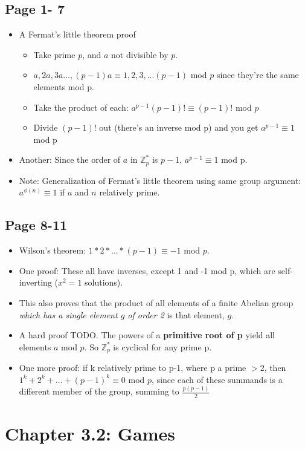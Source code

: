 \documentclass[11pt, oneside]{article}   	%
\begin{document}
\subsection{Page 1- 7}
\begin{itemize}
\item A Fermat's little theorem proof
 \begin{itemize}
  \item Take prime $p$, and $a$ not divisible by $p$.
   \item ${a, 2a, 3a ... , (p-1)a} \equiv {1, 2, 3, ... (p-1)}$ mod $p$ since they're the same elements mod p.
   \item Take the product of each: $a^{p-1}(p-1)! \equiv (p-1)!$ mod $p$
   \item Divide $(p-1)!$ out (there's an inverse mod p) and you get $a^{p-1} \equiv 1$ mod p
  \end{itemize}
 \item Another: Since the order of $a$ in $\mathbb{Z}_p^*$ is $p-1$, $a^{p-1} \equiv 1$ mod p.
 \item Note: Generalization of Fermat's little theorem using same group argument: $a^{\phi(n)} \equiv 1$ if $a$ and $n$ relatively prime.
 \end{itemize}
 
 \subsection{Page 8-11}
 \begin{itemize}
 \item Wilson's theorem: $1 * 2 * ... * (p-1) \equiv -1$ mod $p$.
 \item One proof: These all have inverses, except 1 and -1 mod p, which are self-inverting ($x^2 = 1$ solutions).
 \item This also proves that the product of all elements of a finite Abelian group \emph{which has a single element $g$ of order 2} is that element, $g$.
 \item A hard proof TODO. The powers of a \textbf{primitive root of p} yield all elements $a$ mod $p$.  So $\mathbb{Z}_p^*$ is cyclical for any prime p.
\item One more proof: if k relatively prime to p-1, where p a prime $> 2$, then $1^k + 2^k + ... + (p-1)^k \equiv 0$ mod $p$, since each of these summands is a different member of the group, summing to $\frac{p(p-1)}{2}$
 \end{itemize}
 
 \section{Chapter 3.2: Games}
\end{document}
